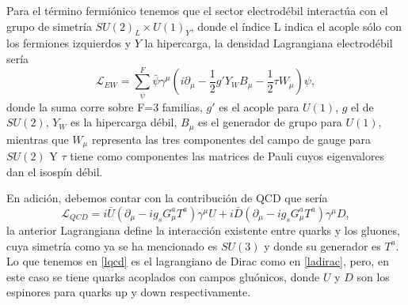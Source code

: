 Para el término fermiónico tenemos que el sector electrodébil interactúa con el grupo de simetría \(SU(2)_L\times U(1)_{Y}\), donde el índice L indica el acople sólo con los fermiones izquierdos y \(Y\) la hipercarga, la densidad Lagrangiana electrodébil sería
\begin{equation}
    \mathcal{L}_{EW} = \sum_{\psi}^{F}\bar{\psi}\gamma^{\mu}\left(i\partial_{\mu}-\frac{1}{2}g'Y_{W}B_{\mu}-\frac{1}{2}\tau W_{\mu}\right)\psi, 
\end{equation}
donde la suma corre sobre F=3 familias, \(g'\) es el acople para \(U(1)\), \(g\) el de \(SU(2)\), \(Y_{W}\) es la hipercarga débil, \(B_{\mu}\) es el generador de grupo para \(U(1)\), mientras que \(W_{\mu}\) representa las tres componentes del campo de gauge para \(SU(2)\) Y \(\tau\) tiene como componentes las matrices de Pauli cuyos eigenvalores dan el isospín débil.

En adición, debemos contar con la contribución de QCD que sería
\begin{equation}
    \mathcal{L}_{QCD} = i\bar{U}\left(\partial_{\mu}-ig_{s}G^a_{\mu}T^a\right)\gamma^{\mu}U+i\bar{D}\left(\partial_{\mu}-ig_{s}G^a_{\mu}T^a\right)\gamma^\mu D, \label{lqcd}
\end{equation}
la anterior Lagrangiana define la interacción existente entre quarks y los gluones, cuya simetría como ya se ha mencionado es \(SU(3)\) y donde su generador es \(T^a\). Lo que tenemos en \ref{lqcd} es el lagrangiano de Dirac como en \ref{ladirac}, pero, en este caso se tiene quarks acoplados con campos gluónicos, donde \(U\) y \(D\) son los espinores para quarks up y down respectivamente.

